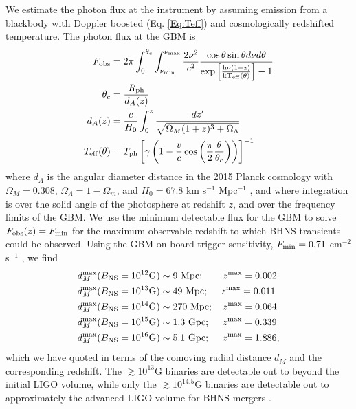 We estimate the photon flux at the instrument by assuming emission
from a blackbody with Doppler boosted (Eq. \ref{Eq:Teff}) and
cosmologically redshifted temperature. The photon flux at the GBM is
\begin{align}
F_{\rm{obs}} &= 2 \pi \int^{\theta_c}_{0}\int^{\nu_{\rm{max}}}_{\nu_{\rm{min}}}{  \frac{2 \nu^2}{ c^2} \frac{\cos{\theta} \sin{\theta} d \nu d\theta}{\rm{exp\left[\frac{h \nu (1+z)}{ k T_{\rm{eff}}(\theta)}\right] - 1} }  }  \\ \nonumber
%
\theta_c &=\frac{R_{\rm{ph}}}{d_A(z)}  \\ \nonumber
%
d_A(z) &= \frac{c}{H_0} \int^z_0{\frac{dz'}{\sqrt{\Omega_M(1+z)^3 + \Omega_{\Lambda}}}}   \\ \nonumber
%
T_{\rm{eff}}(\theta)&= T_{\rm{ph}}\left[ \gamma \left( 1 - \frac{v}{c} \cos{\left( \frac{\pi}{2} \frac{\theta}{\theta_c}\right) } \right)\right]^{-1}
\end{align}
where $d_A$ is the angular diameter distance in the 2015 Planck
cosmology with $\Omega_M = 0.308$, $\Omega_{\Lambda} = 1-\Omega_m$,
and $H_0 = 67.8$ km s$^{-1}$ Mpc$^{-1}$
\citep{Planck:2015:CosmoParams}, and where integration is over the
solid angle of the photosphere at redshift $z$, and over the frequency
limits of the GBM. We use the minimum detectable flux for the GBM to
solve $F_{\rm{obs}}(z) = F_{\rm{min}}$ for the maximum observable
redshift to which BHNS transients could be observed. Using the GBM
on-board trigger sensitivity, $F_{\rm{min}} = 0.71$ cm$^{-2}$ s$^{-1}$
\citep{FERMIGBM:2015}, we find
\begin{align}
d^{\rm max}_M (B_{\rm NS} = 10^{12} \mbox{G}) &\sim 9 \  \mbox{Mpc};  \ \ \ \quad z^{\rm{max}} = 0.002   \nonumber \\ 
d^{\rm max}_M (B_{\rm NS} = 10^{13} \mbox{G}) &\sim 49 \  \mbox{Mpc};  \ \quad z^{\rm{max}} = 0.011   \nonumber \\ 
d^{\rm max}_M (B_{\rm NS} = 10^{14} \mbox{G}) &\sim 270 \  \mbox{Mpc};  \quad z^{\rm{max}} = 0.064   \nonumber \\
d^{\rm max}_M (B_{\rm NS} = 10^{15} \mbox{G}) &\sim 1.3 \  \mbox{Gpc};  \ \quad z^{\rm{max}} = 0.339   \nonumber \\
d^{\rm max}_M (B_{\rm NS} = 10^{16} \mbox{G}) & \sim 5.1 \  \mbox{Gpc};  \ \quad z^{\rm{max}} = 1.886,
\end{align}
which we have quoted in terms of the comoving radial distance $d_M$
and the corresponding redshift. The $\gtrsim 10^{13}$G binaries are
detectable out to beyond the initial LIGO volume, while only the
$\gtrsim 10^{14.5}$G binaries are detectable out to approximately the
advanced LIGO volume for BHNS mergers \citep[redshift
  $z\sim0.1$;][]{LIGORates:2010}.


